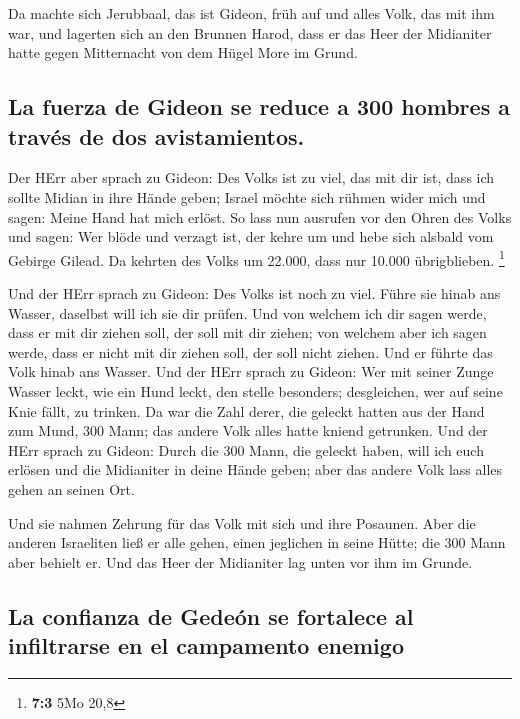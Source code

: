  Da machte sich Jerubbaal, das ist Gideon, früh auf und
alles Volk, das mit ihm war, und lagerten sich an den Brunnen Harod,
dass er das Heer der Midianiter hatte gegen Mitternacht von dem Hügel
More im Grund.

\hypertarget{la-fuerza-de-gideon-se-reduce-a-300-hombres-a-travuxe9s-de-dos-avistamientos.}{%
\subsection{La fuerza de Gideon se reduce a 300 hombres a través de dos
avistamientos.}\label{la-fuerza-de-gideon-se-reduce-a-300-hombres-a-travuxe9s-de-dos-avistamientos.}}

 Der HErr aber sprach zu Gideon: Des Volks ist zu viel,
das mit dir ist, dass ich sollte Midian in ihre Hände geben; Israel
möchte sich rühmen wider mich und sagen: Meine Hand hat mich erlöst.
 So lass nun ausrufen vor den Ohren des Volks und sagen:
Wer blöde und verzagt ist, der kehre um und hebe sich alsbald vom
Gebirge Gilead. Da kehrten des Volks um 22.000, dass nur 10.000
übrigblieben. \footnote{\textbf{7:3} 5Mo 20,8}

 Und der HErr sprach zu Gideon: Des Volks ist noch zu
viel. Führe sie hinab ans Wasser, daselbst will ich sie dir prüfen. Und
von welchem ich dir sagen werde, dass er mit dir ziehen soll, der soll
mit dir ziehen; von welchem aber ich sagen werde, dass er nicht mit dir
ziehen soll, der soll nicht ziehen.  Und er führte das
Volk hinab ans Wasser. Und der HErr sprach zu Gideon: Wer mit seiner
Zunge Wasser leckt, wie ein Hund leckt, den stelle besonders;
desgleichen, wer auf seine Knie fällt, zu trinken.  Da war
die Zahl derer, die geleckt hatten aus der Hand zum Mund, 300 Mann; das
andere Volk alles hatte kniend getrunken.  Und der HErr
sprach zu Gideon: Durch die 300 Mann, die geleckt haben, will ich euch
erlösen und die Midianiter in deine Hände geben; aber das andere Volk
lass alles gehen an seinen Ort.

 Und sie nahmen Zehrung für das Volk mit sich und ihre
Posaunen. Aber die anderen Israeliten ließ er alle gehen, einen
jeglichen in seine Hütte; die 300 Mann aber behielt er. Und das Heer der
Midianiter lag unten vor ihm im Grunde.

\hypertarget{la-confianza-de-gedeuxf3n-se-fortalece-al-infiltrarse-en-el-campamento-enemigo}{%
\subsection{La confianza de Gedeón se fortalece al infiltrarse en el
campamento
enemigo}\label{la-confianza-de-gedeuxf3n-se-fortalece-al-infiltrarse-en-el-campamento-enemigo}}

